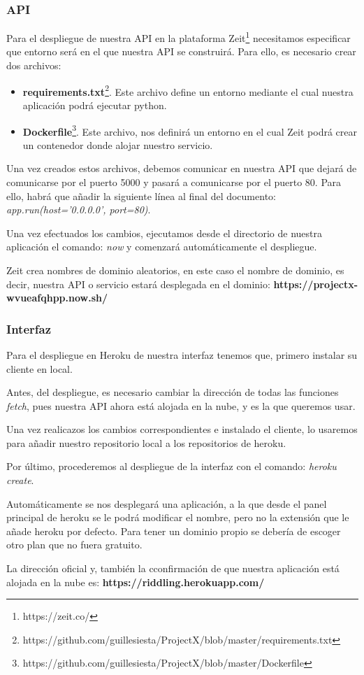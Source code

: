 \subsubsection{API}

Para el despliegue de nuestra API en la plataforma Zeit\footnote{https://zeit.co/} necesitamos especificar que entorno será en el que nuestra API se construirá. Para ello, es necesario crear dos archivos:

\begin{itemize}
    \item \textbf{requirements.txt}\footnote{https://github.com/guillesiesta/ProjectX/blob/master/requirements.txt}. Este archivo define un entorno mediante el cual nuestra aplicación podrá ejecutar python.
    
    \item \textbf{Dockerfile}\footnote{https://github.com/guillesiesta/ProjectX/blob/master/Dockerfile}. Este archivo, nos definirá un entorno en el cual Zeit podrá crear un contenedor donde alojar nuestro servicio.
\end{itemize}

Una vez creados estos archivos, debemos comunicar en nuestra API que dejará de comunicarse por el puerto 5000 y pasará a comunicarse por el puerto 80. Para ello, habrá que añadir la siguiente línea al final del documento: \textit{app.run(host='0.0.0.0', port=80)}.

Una vez efectuados los cambios, ejecutamos desde el directorio de nuestra aplicación el comando: \textit{now} y comenzará automáticamente el despliegue. 

Zeit crea nombres de dominio aleatorios, en este caso el nombre de dominio, es decir, nuestra API o servicio estará desplegada en el dominio: \textbf{https://projectx-wvueafqhpp.now.sh/}

\subsubsection{Interfaz}

Para el despliegue en Heroku de nuestra interfaz tenemos que, primero instalar su cliente en local\cite{heroku}.

Antes, del despliegue, es necesario cambiar la dirección de todas las funciones \textit{fetch}, pues nuestra API ahora está alojada en la nube, y es la que queremos usar.

Una vez realicazos los cambios correspondientes e instalado el cliente, lo usaremos para añadir nuestro repositorio local a los repositorios de heroku\cite{heroku2}. 

Por último, procederemos al despliegue de la interfaz con el comando: \textit{heroku create}.

Automáticamente se nos desplegará una aplicación, a la que desde el panel principal de heroku se le podrá modificar el nombre, pero no la extensión que le añade heroku por defecto. Para tener un dominio propio se debería de escoger otro plan que no fuera gratuito.

La dirección oficial y, también la cconfirmación de que nuestra aplicación está alojada en la nube es: \textbf{https://riddling.herokuapp.com/}